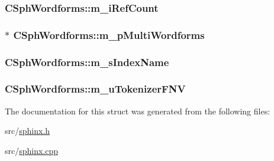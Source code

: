 \hypertarget{structCSphWordforms_adf2448280ec7d206e8842f73297ea3fa}{
\subsubsection[{m\-\_\-i\-Ref\-Count}]{ C\-Sph\-Wordforms\-::m\-\_\-i\-Ref\-Count}}\label{structCSphWordforms_adf2448280ec7d206e8842f73297ea3fa}
\hypertarget{structCSphWordforms_a5f8c7e4b43c2ae7a56be30b2fa4bee83}{
\subsubsection[{m\-\_\-p\-Multi\-Wordforms}]{$\ast$ C\-Sph\-Wordforms\-::m\-\_\-p\-Multi\-Wordforms}}\label{structCSphWordforms_a5f8c7e4b43c2ae7a56be30b2fa4bee83}
\hypertarget{structCSphWordforms_a69571fccf4ebb86c4c1d61e6b1af4837}{
\subsubsection[{m\-\_\-s\-Index\-Name}]{ C\-Sph\-Wordforms\-::m\-\_\-s\-Index\-Name}}\label{structCSphWordforms_a69571fccf4ebb86c4c1d61e6b1af4837}
\hypertarget{structCSphWordforms_a02ddb5542979b4c66f3c1708506ef607}{
\subsubsection[{m\-\_\-u\-Tokenizer\-F\-N\-V}]{ C\-Sph\-Wordforms\-::m\-\_\-u\-Tokenizer\-F\-N\-V}}\label{structCSphWordforms_a02ddb5542979b4c66f3c1708506ef607}


The documentation for this struct was generated from the following files\-:\begin{DoxyCompactItemize}
\item 
src/\hyperlink{sphinx_8h}{sphinx.\-h}\item 
src/\hyperlink{sphinx_8cpp}{sphinx.\-cpp}\end{DoxyCompactItemize}
